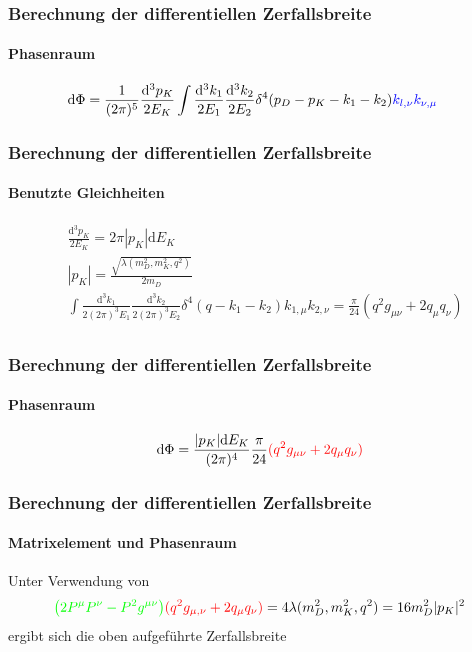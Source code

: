 \documentclass[hyperref={pdfpagelabels=false}]{beamer}
\begin{document}
\begin{frame}
   \frametitle{Berechnung der differentiellen Zerfallsbreite}
  \framesubtitle{Phasenraum}
   \begin{align*}
  \mathrm{d} \Phi & = \frac{1}{(2\pi)^5}\frac{\mathrm{d}^3p_K}{2E_K} \int \frac{\mathrm{d}^3k_1}{2E_1} \frac{\mathrm{d}^3k_2}{2E_2}\delta^4(p_D-p_K-k_1-k_2)\color{blue}{k_{l,\nu}k_{\nu,\mu}}
 \end{align*}
\end{frame}

\begin{frame}
    \frametitle{Berechnung der differentiellen Zerfallsbreite}
  \framesubtitle{Benutzte Gleichheiten}
\begin{align*}
 & \frac{\mathrm{d}^3p_K}{2E_K} = 2\pi |p_K|\mathrm{d}E_K\\
&|p_K| = \frac{\sqrt{\lambda(m_D^2, m_K^2, q^2)}}{2m_D}\\
&\int \frac{\mathrm{d}^3k_1}{2(2\pi)^3E_1} \frac{\mathrm{d}^3k_2}{2(2\pi)^3E_2}\delta^4(q-k_1-k_2)k_{1,\mu} k_{2,\nu} = \frac{\pi}{24}(q^2g_{\mu\nu} + 2q_\mu q_\nu)\\
\end{align*}
  
\end{frame}

\begin{frame}
     \frametitle{Berechnung der differentiellen Zerfallsbreite}
  \framesubtitle{Phasenraum}
  \begin{align*}
   \mathrm{d}\Phi = \frac{|p_K|\mathrm{d}E_K}{(2\pi)^4}\frac{\pi}{24}\color{red}{(q^2 g_{\mu\nu}+2q_\mu q_\nu)}
  \end{align*}

\end{frame}

\begin{frame}
     \frametitle{Berechnung der differentiellen Zerfallsbreite}
  \framesubtitle{Matrixelement und Phasenraum}
  Unter Verwendung von 
  \begin{align*}
  \color{green}{\big(2P^\mu P^\nu - P^2 g^{\mu\nu}\big)}\color{red}{(q^2 g_{\mu,\nu}+2q_\mu q_\nu)}\color{black} = 4 \lambda(m_D^2,m_K^2,q^2) = 16 m_D^2 |p_K|^2
  \end{align*}
  ergibt sich die oben aufgeführte Zerfallsbreite
  
\end{frame}
\end{document}
